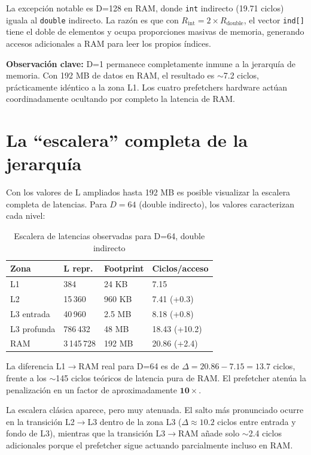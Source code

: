 \documentclass[12pt,a4paper]{article}
\begin{document}
La excepción notable es D=128 en RAM, donde \texttt{int} indirecto (19.71 ciclos) iguala al \texttt{double} indirecto. La razón es que con $R_\text{int} = 2 \times R_\text{double}$, el vector \texttt{ind[]} tiene el doble de elementos y ocupa proporciones masivas de memoria, generando accesos adicionales a RAM para leer los propios índices.

\textbf{Observación clave:} D=1 permanece completamente inmune a la jerarquía de memoria. Con 192 MB de datos en RAM, el resultado es $\sim$7.2 ciclos, prácticamente idéntico a la zona L1. Los cuatro prefetchers hardware actúan coordinadamente ocultando por completo la latencia de RAM.

\section{La ``escalera'' completa de la jerarquía}

Con los valores de L ampliados hasta 192 MB es posible visualizar la escalera completa de latencias. Para $D=64$ (double indirecto), los valores caracterizan cada nivel:

\begin{table}[H]
\centering
\caption{Escalera de latencias observadas para D=64, double indirecto}
\label{tab:escalera}
\begin{tabular}{llll}
\toprule
\textbf{Zona} & \textbf{L repr.} & \textbf{Footprint} & \textbf{Ciclos/acceso} \\
\midrule
L1          & 384       & 24 KB   & 7.15 \\
L2          & 15\,360   & 960 KB  & 7.41 (+0.3) \\
L3 entrada  & 40\,960   & 2.5 MB  & 8.18 (+0.8) \\
L3 profunda & 786\,432  & 48 MB   & 18.43 (+10.2) \\
RAM         & 3\,145\,728 & 192 MB & 20.86 (+2.4) \\
\bottomrule
\end{tabular}
\end{table}

La diferencia L1$\to$RAM real para D=64 es de $\Delta = 20.86 - 7.15 = \mathbf{13.7}$ ciclos, frente a los $\sim$145 ciclos teóricos de latencia pura de RAM. El prefetcher atenúa la penalización en un factor de aproximadamente $\mathbf{10\times}$.

La escalera clásica aparece, pero muy atenuada. El salto más pronunciado ocurre en la transición L2$\to$L3 dentro de la zona L3 ($\Delta \approx 10.2$ ciclos entre entrada y fondo de L3), mientras que la transición L3$\to$RAM añade solo $\sim$2.4 ciclos adicionales porque el prefetcher sigue actuando parcialmente incluso en RAM.
\end{document}
